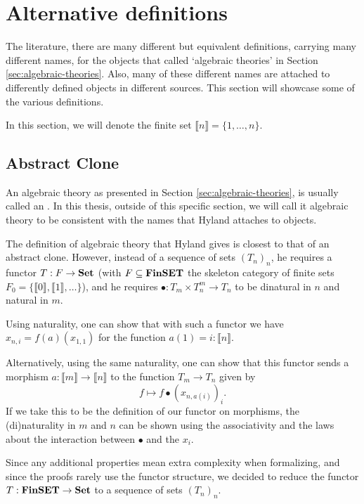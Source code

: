\chapter{Alternative definitions}\label{ch:alternative-definitions}
The literature, there are many different but equivalent definitions, carrying many different names, for the objects that called `algebraic theories' in Section \ref{sec:algebraic-theories}. Also, many of these different names are attached to differently defined objects in different sources. This section will showcase some of the various definitions.

In this section, we will denote the finite set $ \llbracket n \rrbracket = \{ 1, \dots, n \} $.

\section{Abstract Clone}
\begin{definition}
  An algebraic theory as presented in Section \ref{sec:algebraic-theories}, is usually called an . In this thesis, outside of this specific section, we will call it algebraic theory to be consistent with the names that Hyland attaches to objects.
\end{definition}

\begin{remark}\label{rem:abstract-clone-functor}
  The definition of algebraic theory that Hyland gives is closest to that of an abstract clone. However, instead of a sequence of sets $ (T_n)_n $, he requires a functor $ T: F \to \mathbf{Set} $ (with $ F \subseteq \mathbf{FinSET} $ the skeleton category of finite sets $ F_0 = \{ \llbracket 0 \rrbracket, \llbracket 1 \rrbracket, \dots \} $), and he requires $ \bullet: T_m \times T_n^m \to T_n $ to be dinatural in $ n $ and natural in $ m $.

  Using naturality, one can show that with such a functor we have $ x_{n, i} = f(a)(x_{1, 1}) $ for the function $ a(1) = i : \llbracket n \rrbracket $.

  Alternatively, using the same naturality, one can show that this functor sends a morphism $ a: \llbracket m \rrbracket \to \llbracket n \rrbracket $ to the function $ T_m \to T_n $ given by
  \[ f \mapsto f \bullet (x_{n, a(i)})_i. \]
  If we take this to be the definition of our functor on morphisms, the (di)naturality in $ m $ and $ n $ can be shown using the associativity and the laws about the interaction between $ \bullet $ and the $ x_i $.

  Since any additional properties mean extra complexity when formalizing, and since the proofs rarely use the functor structure, we decided to reduce the functor $ T: \mathbf{FinSET} \to \mathbf{Set} $ to a sequence of sets $ (T_n)_n $.
\end{remark}

